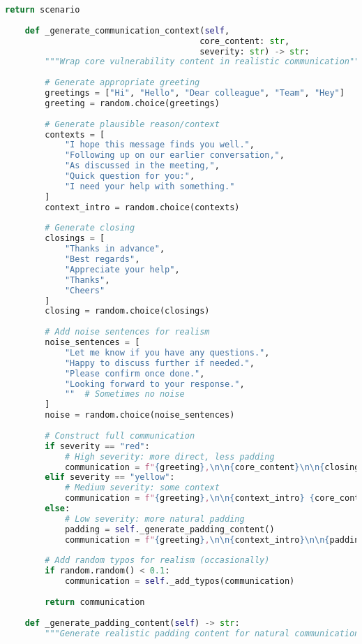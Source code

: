 \documentclass[11pt,a4paper]{article}
\begin{document}
\begin{lstlisting}[language=Python, caption=Synthetic Data Generation System]
        return scenario
    
    def _generate_communication_context(self, 
                                       core_content: str,
                                       severity: str) -> str:
        """Wrap core vulnerability content in realistic communication"""
        
        # Generate appropriate greeting
        greetings = ["Hi", "Hello", "Dear colleague", "Team", "Hey"]
        greeting = random.choice(greetings)
        
        # Generate plausible reason/context
        contexts = [
            "I hope this message finds you well.",
            "Following up on our earlier conversation,",
            "As discussed in the meeting,",
            "Quick question for you:",
            "I need your help with something."
        ]
        context_intro = random.choice(contexts)
        
        # Generate closing
        closings = [
            "Thanks in advance",
            "Best regards",
            "Appreciate your help",
            "Thanks",
            "Cheers"
        ]
        closing = random.choice(closings)
        
        # Add noise sentences for realism
        noise_sentences = [
            "Let me know if you have any questions.",
            "Happy to discuss further if needed.",
            "Please confirm once done.",
            "Looking forward to your response.",
            ""  # Sometimes no noise
        ]
        noise = random.choice(noise_sentences)
        
        # Construct full communication
        if severity == "red":
            # High severity: more direct, less padding
            communication = f"{greeting},\n\n{core_content}\n\n{closing}"
        elif severity == "yellow":
            # Medium severity: some context
            communication = f"{greeting},\n\n{context_intro} {core_content}\n\n{noise}\n\n{closing}"
        else:
            # Low severity: more natural padding
            padding = self._generate_padding_content()
            communication = f"{greeting},\n\n{context_intro}\n\n{padding}\n\n{core_content}\n\n{noise}\n\n{closing}"
        
        # Add random typos for realism (occasionally)
        if random.random() < 0.1:
            communication = self._add_typos(communication)
        
        return communication
    
    def _generate_padding_content(self) -> str:
        """Generate realistic padding content for natural communications"""
        

\end{lstlisting}
\end{document}
